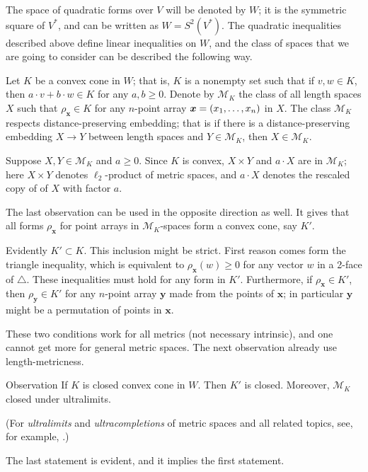\documentclass[a4paper,10pt]{article}
\begin{document}
The space of quadratic forms over $V$ will be denoted by $W$;
it is the symmetric square of $V^*$, and can be written as $W=S^2(V^*)$.
The quadratic inequalities described above define linear inequalities on $W$,
and the class of spaces that we are going to consider can be described the following way.

Let $K$ be a convex cone in $W$;
that is, $K$ is a nonempty set such that if $v,w\in K$, then $a\cdot v+b\cdot w\in K$ for any $a,b\ge0$.
Denote by $\mathcal{M}_K$ the class of all length spaces $X$ such that
$\rho_{\bm{x}}\in K$ for any $n$-point array $\bm{x}\z=(x_1,\dots,x_n)$ in $X$.
The class $\mathcal{M}_K$ respects distance-preserving embedding; that is
if there is a distance-preserving embedding $X\to Y$ between length spaces and $Y \in  \mathcal{M}_K$, then $X\in \mathcal{M}_K$.

Suppose $X,Y\in  \mathcal{M}_K$ and $a\ge 0$.
Since $K$ is convex,  $X\times Y$ and $a\cdot X$ are in $\mathcal{M}_K$;
here $X\times Y$ denotes $\ell_2$-product of metric spaces, and 
$a\cdot X$ denotes the rescaled copy of of $X$ with factor $a$. 

The last observation can be used in the opposite direction as well.
It gives that all forms $\rho_{\bm{x}}$ for point arrays in $\mathcal{M}_K$-spaces form a convex cone, say $K'$.

Evidently $K'\subset K$.
This inclusion might be strict.
First reason comes form the triangle inequality, which is equivalent to $\rho_{\bm{x}}(w)\ge 0$ for any vector $w$ in a 2-face of $\triangle$.
These inequalities must hold for any form in $K'$.
Furthermore, if $\rho_{\bm{x}}\in K'$, then $\rho_{\bm{y}}\in K'$ for any $n$-point array $\bm{y}$ made from the points of $\bm{x}$; in particular $\bm{y}$ might be a permutation of points in $\bm{x}$.

These two conditions work for all metrics (not necessary intrinsic),
and one cannot get more for general metric spaces.
The next observation already use length-metricness.

\begin{thm}{Observation}
If $K$ is closed convex cone in $W$.
Then $K'$ is closed.
Moreover, $\mathcal{M}_K$ closed under ultralimits.
\end{thm}


(For \emph{ultralimits} and \emph{ultracompletions} of metric spaces and all related topics, see, for example, \cite{petrunin2023}.)

The last statement is evident, and it implies the first statement.
\end{document}
